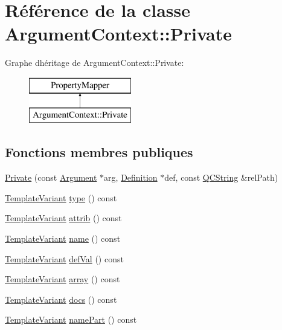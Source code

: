 \hypertarget{class_argument_context_1_1_private}{}\section{Référence de la classe Argument\+Context\+:\+:Private}
\label{class_argument_context_1_1_private}
Graphe d\textquotesingle{}héritage de Argument\+Context\+:\+:Private\+:\begin{figure}[H]
\begin{center}
\leavevmode
\includegraphics[height=2.000000cm]{class_argument_context_1_1_private}
\end{center}
\end{figure}
\subsection*{Fonctions membres publiques}
\begin{DoxyCompactItemize}
\item 
\hyperlink{class_argument_context_1_1_private_ab0edcb2f52bce253c6791af031c2ebcd}{Private} (const \hyperlink{struct_argument}{Argument} $\ast$arg, \hyperlink{class_definition}{Definition} $\ast$def, const \hyperlink{class_q_c_string}{Q\+C\+String} \&rel\+Path)
\item 
\hyperlink{class_template_variant}{Template\+Variant} \hyperlink{class_argument_context_1_1_private_a91bb6a6c590966d2c6e91667de3056c2}{type} () const 
\item 
\hyperlink{class_template_variant}{Template\+Variant} \hyperlink{class_argument_context_1_1_private_addd6243e80271c282f6c200d987d4543}{attrib} () const 
\item 
\hyperlink{class_template_variant}{Template\+Variant} \hyperlink{class_argument_context_1_1_private_a9220a566d4f9ab8c503654c87779fafd}{name} () const 
\item 
\hyperlink{class_template_variant}{Template\+Variant} \hyperlink{class_argument_context_1_1_private_a6279d50ecf7607caf89dcdef7b59eef8}{def\+Val} () const 
\item 
\hyperlink{class_template_variant}{Template\+Variant} \hyperlink{class_argument_context_1_1_private_a15743fe8de21ac9d87c2f9f3a76d3d51}{array} () const 
\item 
\hyperlink{class_template_variant}{Template\+Variant} \hyperlink{class_argument_context_1_1_private_a4c201bda7b4121750758ec31dd8739ba}{docs} () const 
\item 
\hyperlink{class_template_variant}{Template\+Variant} \hyperlink{class_argument_context_1_1_private_afb05eef862baee792e396806b414ec72}{name\+Part} () const 
\end{DoxyCompactItemize}


